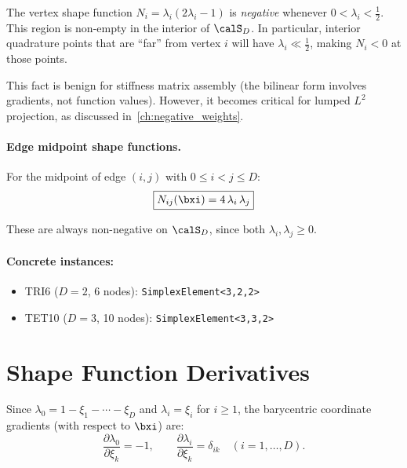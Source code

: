 \begin{remark}
\label{rem:vertex_negative}
The vertex shape function $N_i = \lambda_i(2\lambda_i - 1)$ is \emph{negative}
whenever $0 < \lambda_i < \tfrac{1}{2}$.  This region is non-empty in the
interior of $\calS_D$.  In particular, interior quadrature points that are
``far'' from vertex $i$ will have $\lambda_i \ll \tfrac{1}{2}$, making
$N_i < 0$ at those points.

This fact is benign for stiffness matrix assembly (the bilinear form involves
gradients, not function values).  However, it becomes critical for lumped $L^2$
projection, as discussed in~\cref{ch:negative_weights}.
\end{remark}

\paragraph{Edge midpoint shape functions.}
For the midpoint of edge $(i, j)$ with $0 \le i < j \le D$:
\begin{equation}
  \boxed{N_{ij}(\bxi) = 4\,\lambda_i\,\lambda_j}
  \label{eq:shape_edge_quad}
\end{equation}

These are always non-negative on $\calS_D$, since both $\lambda_i, \lambda_j
\ge 0$.

\paragraph{Concrete instances:}
\begin{itemize}[nosep]
  \item TRI6 ($D=2$, 6 nodes): \texttt{SimplexElement<3,2,2>}
  \item TET10 ($D=3$, 10 nodes): \texttt{SimplexElement<3,3,2>}
\end{itemize}


\section{Shape Function Derivatives}
\label{sec:derivatives}

Since $\lambda_0 = 1 - \xi_1 - \cdots - \xi_D$ and $\lambda_i = \xi_i$ for
$i \ge 1$, the barycentric coordinate gradients (with respect to $\bxi$) are:
\begin{equation}
  \frac{\partial \lambda_0}{\partial \xi_k} = -1, \qquad
  \frac{\partial \lambda_i}{\partial \xi_k} = \delta_{ik}
  \quad (i = 1, \dots, D).
  \label{eq:bary_grad}
\end{equation}

